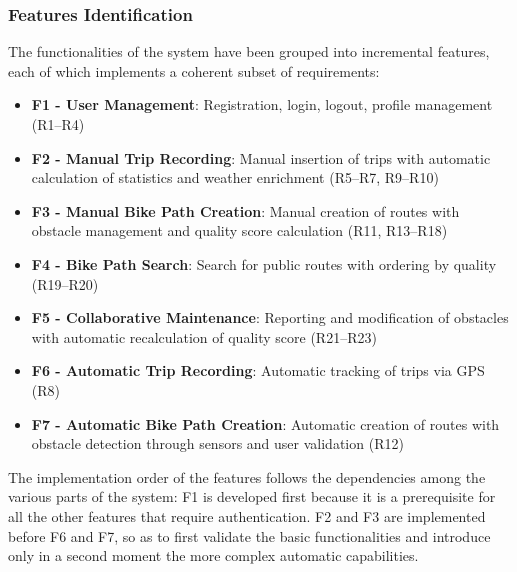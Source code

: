 \subsubsection{Features Identification}
The functionalities of the system have been grouped into incremental features, each of which implements a coherent subset of requirements:
\begin{itemize}
    \item \textbf{F1 - User Management}: Registration, login, logout, profile management (R1–R4)
    \item \textbf{F2 - Manual Trip Recording}: Manual insertion of trips with automatic calculation of statistics and weather enrichment (R5–R7, R9–R10)
    \item \textbf{F3 - Manual Bike Path Creation}: Manual creation of routes with obstacle management and quality score calculation (R11, R13–R18)
    \item \textbf{F4 - Bike Path Search}: Search for public routes with ordering by quality (R19–R20)
    \item \textbf{F5 - Collaborative Maintenance}: Reporting and modification of obstacles with automatic recalculation of quality score (R21–R23)
    \item \textbf{F6 - Automatic Trip Recording}: Automatic tracking of trips via GPS (R8)
    \item \textbf{F7 - Automatic Bike Path Creation}: Automatic creation of routes with obstacle detection through sensors and user validation (R12)
\end{itemize}
The implementation order of the features follows the dependencies among the various parts of the system: F1 is developed first because it is a prerequisite for all the other features that require authentication. F2 and F3 are implemented before F6 and F7, so as to first validate the basic functionalities and introduce only in a second moment the more complex automatic capabilities.

